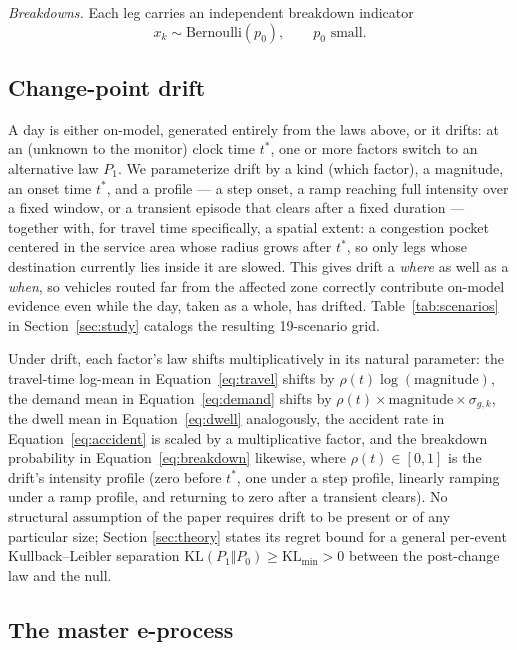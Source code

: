 \documentclass[trsc,dblanonrev]{informs4}
\newcommand{\KL}{\mathrm{KL}}
\begin{document}
\emph{Breakdowns.} Each leg carries an independent breakdown indicator
\begin{equation}\label{eq:breakdown}
x_k \sim \mathrm{Bernoulli}(p_0), \qquad p_0 \text{ small}.
\end{equation}

\subsection{Change-point drift}

A day is either on-model, generated entirely from the laws above, or it
drifts: at an (unknown to the monitor) clock time $t^\ast$, one or more
factors switch to an alternative law $P_1$. We parameterize drift by a
kind (which factor), a magnitude, an onset time $t^\ast$, and a profile
--- a step onset, a ramp reaching full intensity over a fixed window, or
a transient episode that clears after a fixed duration --- together
with, for travel time specifically, a spatial extent: a congestion
pocket centered in the service area whose radius grows after $t^\ast$,
so only legs whose destination currently lies inside it are slowed.
This gives drift a \emph{where} as well as a \emph{when}, so vehicles
routed far from the affected zone correctly contribute on-model
evidence even while the day, taken as a whole, has drifted.
Table~\ref{tab:scenarios} in Section~\ref{sec:study} catalogs the
resulting 19-scenario grid.

Under drift, each factor's law shifts multiplicatively in its natural
parameter: the travel-time log-mean in Equation~\eqref{eq:travel}
shifts by $\rho(t)\log(\text{magnitude})$, the demand mean in
Equation~\eqref{eq:demand} shifts by $\rho(t)\times\text{magnitude}
\times\sigma_{g,k}$, the dwell mean in Equation~\eqref{eq:dwell}
analogously, the accident rate in Equation~\eqref{eq:accident} is
scaled by a multiplicative factor, and the breakdown probability in
Equation~\eqref{eq:breakdown} likewise, where $\rho(t) \in [0,1]$ is the
drift's intensity profile (zero before $t^\ast$, one under a step
profile, linearly ramping under a ramp profile, and returning to zero
after a transient clears). No structural assumption of the paper
requires drift to be present or of any particular size; Section
\ref{sec:theory} states its regret bound for a general per-event
Kullback--Leibler separation $\KL(P_1\Vert P_0) \ge \KL_{\min} > 0$
between the post-change law and the null.

\subsection{The master e-process}\label{sec:eprocess}
\end{document}
